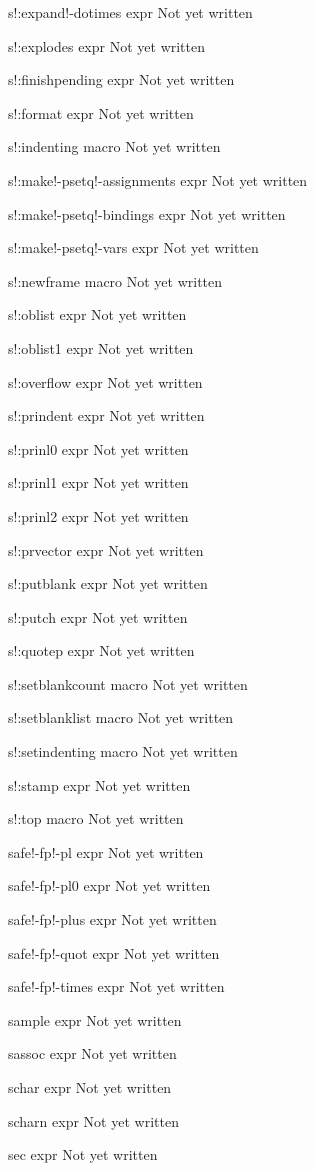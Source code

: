 \documentclass[a4paper,11pt]{article}
\begin{document}
\begin{description}
s!:expand!-dotimes expr
Not yet written

s!:explodes expr
Not yet written

s!:finishpending expr
Not yet written

s!:format expr
Not yet written

s!:indenting macro
Not yet written

s!:make!-psetq!-assignments expr
Not yet written

s!:make!-psetq!-bindings expr
Not yet written

s!:make!-psetq!-vars expr
Not yet written

s!:newframe macro
Not yet written

s!:oblist expr
Not yet written

s!:oblist1 expr
Not yet written

s!:overflow expr
Not yet written

s!:prindent expr
Not yet written

s!:prinl0 expr
Not yet written

s!:prinl1 expr
Not yet written

s!:prinl2 expr
Not yet written

s!:prvector expr
Not yet written

s!:putblank expr
Not yet written

s!:putch expr
Not yet written

s!:quotep expr
Not yet written

s!:setblankcount macro
Not yet written

s!:setblanklist macro
Not yet written

s!:setindenting macro
Not yet written

s!:stamp expr
Not yet written

s!:top macro
Not yet written

safe!-fp!-pl expr
Not yet written

safe!-fp!-pl0 expr
Not yet written

safe!-fp!-plus expr
Not yet written

safe!-fp!-quot expr
Not yet written

safe!-fp!-times expr
Not yet written

sample expr
Not yet written

sassoc expr
Not yet written

schar expr
Not yet written

scharn expr
Not yet written

sec expr
Not yet written


\end{description}
\end{document}
